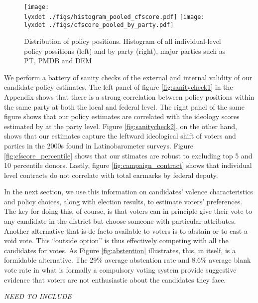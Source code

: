 \documentclass[12pt,english]{article}
\newcommand{\lyxdot}{.}
\numberwithin{equation}{section}
\theoremstyle{plain}
\theoremstyle{remark}
\theoremstyle{plain}
\begin{document}
\begin{figure}[h]
  \centering
  \texttt{[image: \\lyxdot ./figs/histogram\_pooled\_cfscore.pdf]}
  \texttt{[image: \\lyxdot ./figs/cfscore\_pooled\_by\_party.pdf]}
  \caption{Distribution of policy positions. Histogram of all individual-level policy possitions (left) and by party (right),  major parties such as PT, PMDB and DEM}
  \label{fig:cfscore_hist}
\end{figure} 

We perform a battery of sanity checks of the external and internal validity of our candidate policy estimates.  The left panel of figure \ref{fig:sanitycheck1} in the Appendix shows that there is a strong correlation between policy positions within the same party at both the local and federal level. The right panel of the same figure shows that our policy estimates are correlated with the ideology scores estimated by   at the party level. Figure \ref{fig:sanitycheck2}, on the other hand, shows that our estimates capture the leftward ideological shift of voters and parties in the 2000s found in Latinobarometer surveys. Figure \ref{fig:cfscore_percentile} shows that our stimates are robust to excluding top 5 and 10 percentile donors. Lastly, figure \ref{fig:campaign_contract} shows that individual level contracts do not correlate with total earmarks by federal deputy.%

In the next section, we use this information on candidates' valence characteristics and policy choices, along with election results, to estimate voters' preferences.  The key for doing this, of course, is that voters can in principle give their vote to any candidate in the district but choose someone with particular attributes. Another alternative that is de facto available to voters is to abstain or to cast a void vote. This ``outside option'' is thus effectively competing with all the candidates for votes. As Figure  \ref{fig:abstention} illustrates, this, in itself, is a formidable alternative. The 29\% average abstention rate and 8.6\% average blank vote rate in what is formally a compulsory voting system provide suggestive evidence that voters are not enthusiastic about the candidates they face.

\emph{NEED TO INCLUDE}
\end{document}
